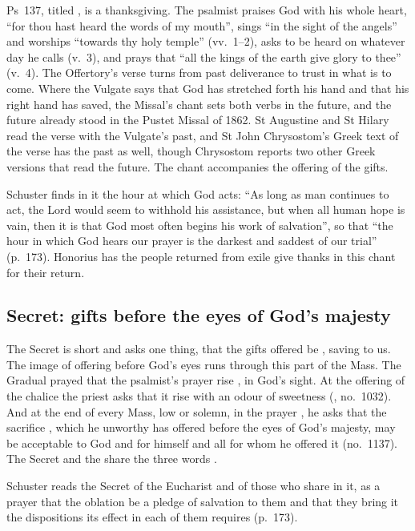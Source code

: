 Ps~137, titled , is a thanksgiving. The psalmist praises God
with his whole heart, ``for thou hast heard the words of my mouth'', sings
``in the sight of the angels'' and worships ``towards thy holy temple''
(vv.~1--2), asks to be heard on whatever day he calls (v.~3), and prays that
``all the kings of the earth give glory to thee'' (v.~4). The Offertory's verse turns from past deliverance to trust in what is
to come. Where the Vulgate says that God has stretched forth his hand and that
his right hand has saved, the Missal's chant sets both verbs in the future, and
the future already stood in the Pustet Missal of 1862. St Augustine and St
Hilary read the verse with the Vulgate's past, and St John Chrysostom's Greek
text of the verse has the past as well, though Chrysostom reports two other
Greek versions that read the future. The chant accompanies the offering of
the gifts.

Schuster finds in it the hour at which God acts: ``As long as man continues to
act, the Lord would seem to withhold his assistance, but when all human hope is
vain, then it is that God most often begins his work of salvation'', so that
``the hour in which God hears our prayer is the darkest and saddest of our
trial'' (p.~173). Honorius has the people returned from exile give thanks in
this chant for their return.

\subsection{Secret: gifts before the eyes of God's majesty}

The Secret is short and asks one thing, that the gifts offered  be , saving to us. The image of offering
before God's eyes runs through this part of the Mass. The Gradual prayed that
the psalmist's prayer rise , in God's sight. At the
offering of the chalice the priest asks that it rise  with an odour of sweetness (,
no.~1032). And at the end of every Mass, low or solemn, in the prayer
, he asks that the sacrifice , which he unworthy has offered before the eyes of God's
majesty, may be acceptable to God and  for himself and all
for whom he offered it (no.~1137). The Secret and the  share the three words .

Schuster reads the Secret of the Eucharist and of those who share in it, as a
prayer that the oblation be a pledge of salvation to them and that they bring
it the dispositions its effect in each of them requires (p.~173).

